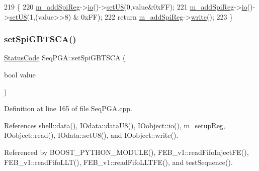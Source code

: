 \begin{DoxyCode}
219                                                      \{
220   \hyperlink{classSeqPGA_af31d87ad56c501584ccb9c60776a1289}{m\_addSpiReg}->\hyperlink{classIOobject_af04fb94137c3d86849f478ac5afab5d1}{io}()->\hyperlink{classIOdata_a6c4fb2f2af01889ada889c2b7aceb24d}{setU8}(0,value&0xFF);
221   \hyperlink{classSeqPGA_af31d87ad56c501584ccb9c60776a1289}{m\_addSpiReg}->\hyperlink{classIOobject_af04fb94137c3d86849f478ac5afab5d1}{io}()->\hyperlink{classIOdata_a6c4fb2f2af01889ada889c2b7aceb24d}{setU8}(1,(value>>8) & 0xFF);
222   \textcolor{keywordflow}{return} \hyperlink{classSeqPGA_af31d87ad56c501584ccb9c60776a1289}{m\_addSpiReg}->\hyperlink{classIOobject_a9f6984bc9f0fadcf800f1be2523ac744}{write}();
223 \}
\end{DoxyCode}
\mbox{\label{classSeqPGA_ae5449d6970bffd8de3670a8a1ce6942d}} 
\subsubsection{\texorpdfstring{set\+Spi\+G\+B\+T\+S\+C\+A()}{setSpiGBTSCA()}}
{\footnotesize\ttfamily \hyperlink{classStatusCode}{Status\+Code} Seq\+P\+G\+A\+::set\+Spi\+G\+B\+T\+S\+CA (\begin{DoxyParamCaption}\item[{bool}]{value }\end{DoxyParamCaption})}



Definition at line 165 of file Seq\+P\+G\+A.\+cpp.



References shell\+::data(), I\+Odata\+::data\+U8(), I\+Oobject\+::io(), m\+\_\+setup\+Reg, I\+Oobject\+::read(), I\+Odata\+::set\+U8(), and I\+Oobject\+::write().



Referenced by B\+O\+O\+S\+T\+\_\+\+P\+Y\+T\+H\+O\+N\+\_\+\+M\+O\+D\+U\+L\+E(), F\+E\+B\+\_\+v1\+::read\+Fifo\+Inject\+F\+E(), F\+E\+B\+\_\+v1\+::read\+Fifo\+L\+L\+T(), F\+E\+B\+\_\+v1\+::read\+Fifo\+L\+L\+T\+F\+E(), and test\+Sequence().


